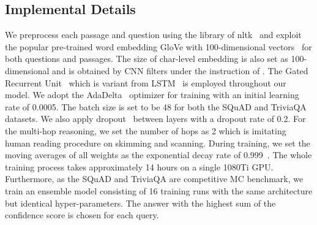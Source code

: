 \documentclass[letterpaper]{article} \usepackage{aaai18}  \usepackage{times}  \usepackage{helvet}  \usepackage{courier}  \usepackage{url}  \usepackage{graphicx}  \usepackage{booktabs}
\begin{document}
 \subsection{Implemental Details}
 We preprocess each passage and question using the library of nltk~\cite{Loper2002NLTKTN} and exploit the popular pre-trained word embedding GloVe with 100-dimensional vectors~\cite{Pennington2014GloveGV} for both questions and passages. The size of char-level embedding is also set as 100-dimensional and is obtained by CNN filters under the instruction of \cite{Kim2014ConvolutionalNN}. The Gated Recurrent Unit~\cite{Cho2014Learning} which is variant from LSTM~\cite{Hochreiter1997Long} is employed throughout our model. We adopt the AdaDelta~\cite{Zeiler2012ADADELTA} optimizer for training with an initial learning rate of 0.0005. The batch size is set to be 48 for both the SQuAD and TriviaQA datasets. We also apply dropout~\cite{Srivastava2014Dropout} between layers with a dropout rate of 0.2. For the multi-hop reasoning, we set the number of hops as 2 which is imitating human reading procedure on skimming and scanning. During training, we set the moving averages of all weights as the exponential decay rate of 0.999~\cite{Lucas2000ExponentiallyWM}. The whole training process takes approximately 14 hours on a single 1080Ti GPU. Furthermore, as the SQuAD and TriviaQA are competitive MC benchmark, we train an ensemble model consisting of 16 training runs with the same architecture but identical hyper-parameters. The answer with the highest sum of the confidence score is chosen for each query.
 
\end{document}
